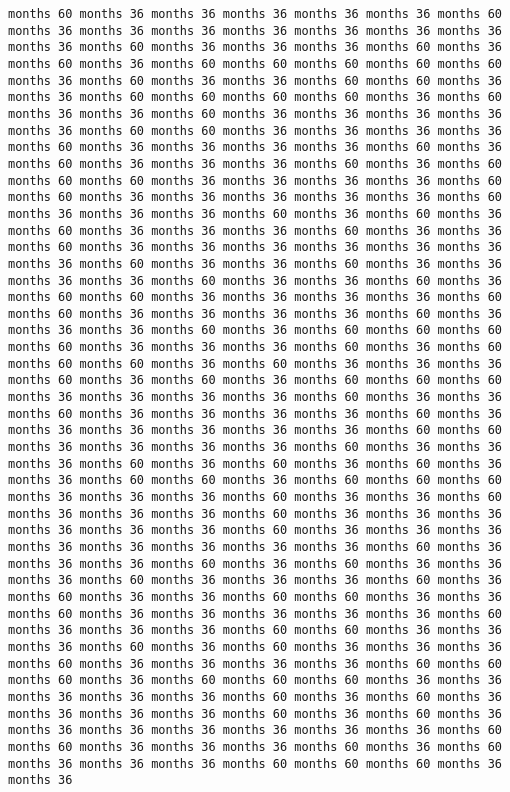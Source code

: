 \documentclass[11pt]{article}
\begin{document}
\begin{Verbatim}[commandchars=\\\{\}, frame=single, framerule=2mm, rulecolor=\color{outerrorbackground}]
months 60 months 36 months 36 months 36 months 36 months 36 months 60 months 36 months 36 months 36 months 36 months 36 months 36 months 36 months 36 months 60 months 36 months 36 months 36 months 60 months 36 months 60 months 36 months 60 months 60 months 60 months 60 months 60 months 36 months 60 months 36 months 36 months 60 months 60 months 36 months 36 months 60 months 60 months 60 months 60 months 36 months 60 months 36 months 36 months 60 months 36 months 36 months 36 months 36 months 36 months 60 months 60 months 36 months 36 months 36 months 36 months 60 months 36 months 36 months 36 months 36 months 60 months 36 months 60 months 36 months 36 months 36 months 60 months 36 months 60 months 60 months 60 months 36 months 36 months 36 months 36 months 60 months 60 months 36 months 36 months 36 months 36 months 36 months 60 months 36 months 36 months 36 months 60 months 36 months 60 months 36 months 60 months 36 months 36 months 36 months 60 months 36 months 36 months 60 months 36 months 36 months 36 months 36 months 36 months 36 months 36 months 60 months 36 months 36 months 60 months 36 months 36 months 36 months 36 months 60 months 36 months 36 months 60 months 36 months 60 months 60 months 36 months 36 months 36 months 36 months 60 months 60 months 36 months 36 months 36 months 36 months 60 months 36 months 36 months 36 months 60 months 36 months 60 months 60 months 60 months 60 months 36 months 36 months 36 months 60 months 36 months 60 months 60 months 60 months 36 months 60 months 36 months 36 months 36 months 60 months 36 months 60 months 36 months 60 months 60 months 60 months 36 months 36 months 36 months 36 months 60 months 36 months 36 months 60 months 36 months 36 months 36 months 36 months 60 months 36 months 36 months 36 months 36 months 36 months 36 months 60 months 60 months 36 months 36 months 36 months 36 months 60 months 36 months 36 months 36 months 60 months 36 months 60 months 36 months 60 months 36 months 36 months 60 months 60 months 36 months 60 months 60 months 60 months 36 months 36 months 36 months 60 months 36 months 36 months 60 months 36 months 36 months 36 months 60 months 36 months 36 months 36 months 36 months 36 months 36 months 60 months 36 months 36 months 36 months 36 months 36 months 36 months 36 months 36 months 60 months 36 months 36 months 36 months 60 months 36 months 60 months 36 months 36 months 36 months 60 months 36 months 36 months 36 months 60 months 36 months 60 months 36 months 36 months 60 months 60 months 36 months 36 months 60 months 36 months 36 months 36 months 36 months 36 months 60 months 36 months 36 months 36 months 60 months 60 months 36 months 36 months 36 months 60 months 36 months 60 months 36 months 36 months 36 months 60 months 36 months 36 months 36 months 36 months 60 months 60 months 60 months 36 months 60 months 60 months 60 months 36 months 36 months 36 months 36 months 36 months 60 months 36 months 60 months 36 months 36 months 36 months 36 months 60 months 36 months 60 months 36 months 36 months 36 months 36 months 36 months 36 months 36 months 60 months 60 months 36 months 36 months 36 months 60 months 36 months 60 months 36 months 36 months 36 months 60 months 60 months 60 months 36 months 36 
\end{Verbatim}
\end{document}
